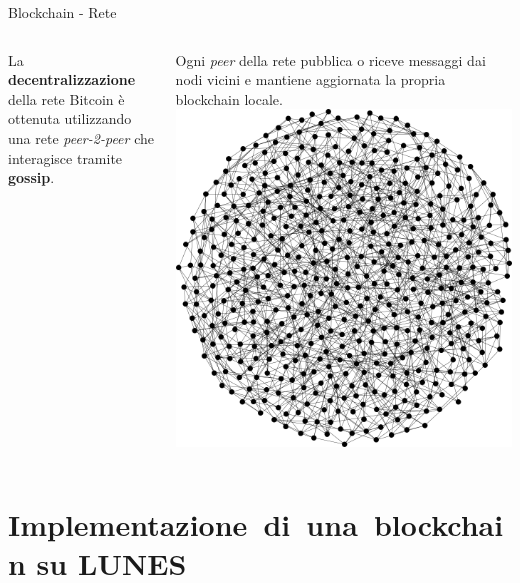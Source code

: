 \documentclass{beamer}
\begin{document}
\begin{frame}{Blockchain - Rete}
	\begin{columns}
        	La \textbf{decentralizzazione} della rete Bitcoin è ottenuta utilizzando una rete \textit{peer-2-peer} che interagisce tramite \textbf{gossip}.\newline
            
            Ogni \textit{peer} della rete pubblica o riceve messaggi dai nodi vicini e mantiene aggiornata la propria blockchain locale.
			\includegraphics[width=\linewidth]{./images/network-500.png}
	\end{columns}
\end{frame}


\section[Implementazione di una blockchain su LUNES]{Implementazione~di~una\newline~blockchain su LUNES}

\end{document}
